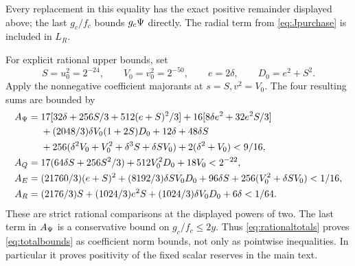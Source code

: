 Every replacement in this equality has the exact positive
remainder displayed above; the last $g_c/f_c$ bounds $g_c\Psi$ directly.
The radial term from \eqref{eq:Jpurchase} is included in $L_R$.

For explicit rational upper bounds, set
\[
 S=u_0^2=2^{-24},\qquad V_0=v_0^2=2^{-50},\qquad
 e=2\delta,\qquad D_0=e^2+S^2.
\]
Apply the nonnegative coefficient majorants at $s=S,v^2=V_0$.
The four resulting sums are bounded by
\begin{align}
 A_\Psi={}&17[32\delta+256S/3+512(e+S)^2/3]
 +16[8\delta e^2+32e^2S/3]\notag\\
 &+(2048/3)\delta V_0(1+2S)D_0
 +12\delta+48\delta S \notag\\
 &+256(\delta^2V_0+V_0^2+\delta^3S+\delta SV_0)
 +2(\delta^2+V_0)<9/16,\notag\\
 A_Q={}&17(64\delta S+256S^2/3)+512V_0^2D_0+18V_0<2^{-22},\notag\\
 A_E={}&(21760/3)(e+S)^2+(8192/3)\delta SV_0D_0
       +96\delta S+256(V_0^2+\delta SV_0)<1/16,\notag\\
 A_R={}&(2176/3)S+(1024/3)e^2S
                +(1024/3)\delta V_0D_0+6\delta<1/64 .
 \label{eq:rationaltotals}
\end{align}
These are strict rational comparisons at the displayed powers of two.
The last term in $A_\Psi$ is a conservative bound on $g_c/f_c\leq2y$.
Thus \eqref{eq:rationaltotals} proves \eqref{eq:totalbounds} as coefficient
norm bounds, not only as pointwise inequalities. In particular it proves
positivity of the fixed scalar reserves in the main text.

